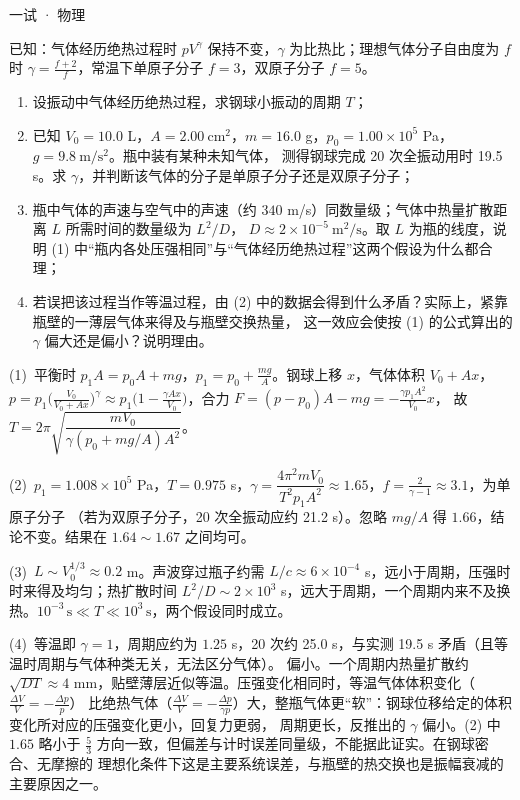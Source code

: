 \documentclass[cjk=noto, seal=first]{mojing-exam}
\begin{document}
\begin{paper}[time={建议 2 小时（训练设置）}, full=100]{一试 · 物理}
\begin{questions}
\begin{withfigure}[.24]
已知：气体经历绝热过程时 $pV^\gamma$ 保持不变，$\gamma$ 为比热比；理想气体分子自由度为 $f$ 时 $\gamma=\frac{f+2}f$，常温下单原子分子
$f=3$，双原子分子 $f=5$。
\end{withfigure}
\begin{enumerate}
  \item 设振动中气体经历绝热过程，求钢球小振动的周期 $T$；
  \item 已知 $V_0=10.0$ L，$A=2.00\ \mathrm{cm}^2$，$m=16.0$ g，$p_0=1.00\times10^5$ Pa，$g=9.8\ \mathrm{m/s^2}$。瓶中装有某种未知气体，
        测得钢球完成 20 次全振动用时 19.5 s。求 $\gamma$，并判断该气体的分子是单原子分子还是双原子分子；
  \item 瓶中气体的声速与空气中的声速（约 $340$ m/s）同数量级；气体中热量扩散距离 $L$ 所需时间的数量级为 $L^2/D$，
        $D\approx2\times10^{-5}\ \mathrm{m^2/s}$。取 $L$ 为瓶的线度，说明 (1) 中“瓶内各处压强相同”与“气体经历绝热过程”这两个假设为什么都合理；
  \item 若误把该过程当作等温过程，由 (2) 中的数据会得到什么矛盾？实际上，紧靠瓶壁的一薄层气体来得及与瓶壁交换热量，
        这一效应会使按 (1) 的公式算出的 $\gamma$ 偏大还是偏小？说明理由。
\end{enumerate}
\answerspace{2cm}
\begin{solution}
(1)~平衡时 $p_1A=p_0A+mg$，$p_1=p_0+\frac{mg}A$。钢球上移 $x$，气体体积 $V_0+Ax$，
$p=p_1\bigl(\frac{V_0}{V_0+Ax}\bigr)^\gamma\approx p_1\bigl(1-\frac{\gamma Ax}{V_0}\bigr)$，合力 $F=(p-p_0)A-mg=-\frac{\gamma p_1A^2}{V_0}x$，
故 $T=2\pi\sqrt{\dfrac{mV_0}{\gamma(p_0+mg/A)A^2}}$。

(2)~$p_1=1.008\times10^5$ Pa，$T=0.975$ s，$\gamma=\dfrac{4\pi^2mV_0}{T^2p_1A^2}\approx1.65$，$f=\frac2{\gamma-1}\approx3.1$，为单原子分子
（若为双原子分子，20 次全振动应约 21.2 s）。忽略 $mg/A$ 得 $1.66$，结论不变。结果在 $1.64\sim1.67$ 之间均可。

(3)~$L\sim V_0^{1/3}\approx0.2$ m。声波穿过瓶子约需 $L/c\approx6\times10^{-4}$ s，远小于周期，压强时时来得及均匀；热扩散时间
$L^2/D\sim2\times10^3$ s，远大于周期，一个周期内来不及换热。$10^{-3}\,\mathrm s\ll T\ll10^3\,\mathrm s$，两个假设同时成立。

(4)~等温即 $\gamma=1$，周期应约为 $1.25$ s，20 次约 25.0 s，与实测 19.5 s 矛盾（且等温时周期与气体种类无关，无法区分气体）。
偏小。一个周期内热量扩散约 $\sqrt{DT}\approx4$ mm，贴壁薄层近似等温。压强变化相同时，等温气体体积变化（$\frac{\Delta V}V=-\frac{\Delta p}{p}$）
比绝热气体（$\frac{\Delta V}V=-\frac{\Delta p}{\gamma p}$）大，整瓶气体更“软”：钢球位移给定的体积变化所对应的压强变化更小，回复力更弱，
周期更长，反推出的 $\gamma$ 偏小。(2) 中 $1.65$ 略小于 $\frac53$ 方向一致，但偏差与计时误差同量级，不能据此证实。在钢球密合、无摩擦的
理想化条件下这是主要系统误差，与瓶壁的热交换也是振幅衰减的主要原因之一。
\end{solution}


\end{questions}
\end{paper}
\end{document}
